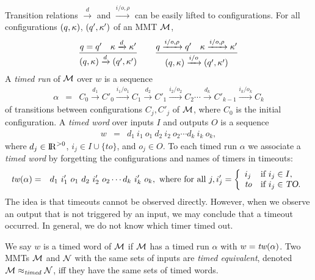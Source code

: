 Transition relations $\xrightarrow{d}$ and $\xrightarrow{i/o, \rho}$ can be easily lifted to configurations.
For all configurations $(q, \kappa)$, $(q', \kappa')$ of an MMT ${\cal M}$,
\[
\frac{q = q' \quad \kappa \xrightarrow{d} \kappa'}{(q,\kappa) \xrightarrow{d} (q',\kappa')}
\quad\quad
  \frac{q \xrightarrow{i/o,\rho} q' \quad \kappa \xrightarrow{i/o, \rho} \kappa'}{(q,\kappa) \xrightarrow{i/o} (q',\kappa')}
\]
A \emph{timed run} of ${\cal M}$ over $w$ is a sequence 
\begin{eqnarray*}
\alpha & = & C_0 \xrightarrow{d_1} C'_0 \xrightarrow{i_1/o_1} C_1 \xrightarrow{d_2} C'_1 \xrightarrow{i_2/o_2} C_2 \cdots
\xrightarrow{d_k} C'_{k-1} \xrightarrow{i_k/o_k} C_{k}
\end{eqnarray*}
of transitions between configurations $C_j, C'_j$ of ${\cal M}$, where $C_0$ is the initial configuration.
A \emph{timed word} over inputs $I$ and outputs $O$ is a sequence
\begin{eqnarray*}
w & = &  d_1 ~ i_1 ~ o_1 ~ d_2 ~ i_2 ~ o_2 \cdots d_k ~ i_k ~ o_k,
\end{eqnarray*}
where $d_j \in {\rm I\!R}^{> 0}$, $i_j \in I \cup \{ \mathit{to} \}$, and $o_j \in O$.
To each timed run $\alpha$ we associate a \emph{timed word} by forgetting the configurations and names of timers
in timeouts:
\begin{eqnarray*}
\mathit{tw}(\alpha) & = & d_1 ~ i'_1 ~ o_1 ~ d_2 ~ i'_2 ~ o_2 \cdots d_k ~ i'_k ~ o_k, \mbox{ where for all } j,
i'_j  =  \left\{ \begin{array}{ll}
i_j & \mbox{if } i_j \in I,\\
\mathit{to} & \mbox{if } i_j \in \mbox{\sl TO}.
\end{array} \right.
\end{eqnarray*}
The idea is that timeouts cannot be observed directly. 
However, when we observe an output that is not triggered by an input, we may
conclude that a timeout occurred. In general, we do not know which timer timed out.

We say $w$ is a timed word of ${\cal M}$ if ${\cal M}$ has a timed run $\alpha$ with $w = \mathit{tw}(\alpha)$.
%
Two MMTs ${\cal M}$ and ${\cal N}$ with the same sets of inputs are \emph{timed equivalent}, denoted ${\cal M} \approx_{\mathit{timed}} {\cal N}$, iff 
they have the same sets of timed words.

